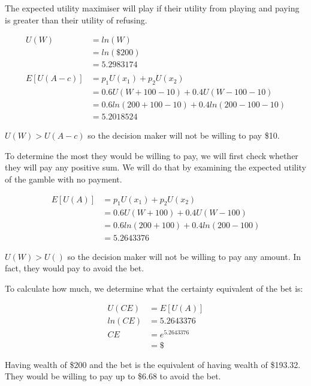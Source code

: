 \documentclass[
  letterpaper,
  DIV=11,
  numbers=noendperiod]{scrreprt}
\begin{document}
\begin{tcolorbox}[enhanced jigsaw, title=\textcolor{quarto-callout-tip-color}{\faLightbulb}\hspace{0.5em}{Answer}, toprule=.15mm, colback=white, breakable, titlerule=0mm, colframe=quarto-callout-tip-color-frame, coltitle=black, opacityback=0, rightrule=.15mm, colbacktitle=quarto-callout-tip-color!10!white, bottomtitle=1mm, opacitybacktitle=0.6, arc=.35mm, bottomrule=.15mm, toptitle=1mm, leftrule=.75mm, left=2mm]

The expected utility maximiser will play if their utility from playing
and paying is greater than their utility of refusing.

\begin{align*}
U(W)&=ln(W) \\
&=ln(\$200) \\
&=5.2983174 \\
\\
E[U(A-c)]&=p_1U(x_1)+p_2U(x_2) \\
&=0.6U(W+100-10)+0.4U(W-100-10) \\
&=0.6ln(200+100-10)+0.4ln(200-100-10) \\
&=5.2018524
\end{align*}

\(U(W)>U(A-c)\) so the decision maker will not be willing to pay \$10.

To determine the most they would be willing to pay, we will first check
whether they will pay any positive sum. We will do that by examining the
expected utility of the gamble with no payment.

\begin{align*}
E[U(A)]&=p_1U(x_1)+p_2U(x_2) \\
&=0.6U(W+100)+0.4U(W-100) \\
&=0.6ln(200+100)+0.4ln(200-100) \\
&=5.2643376
\end{align*}

\(U(W)>U()\) so the decision maker will not be willing to pay any
amount. In fact, they would pay to avoid the bet.

To calculate how much, we determine what the certainty equivalent of the
bet is:

\begin{align*}
U(CE)&=E[U(A)] \\
ln(CE)&=5.2643376\\
CE&=e^{5.2643376} \\
&=\$
\end{align*}

Having wealth of \$200 and the bet is the equivalent of having wealth of
\$193.32. They would be willing to pay up to \$6.68 to avoid the bet.

\end{tcolorbox}
\end{document}
